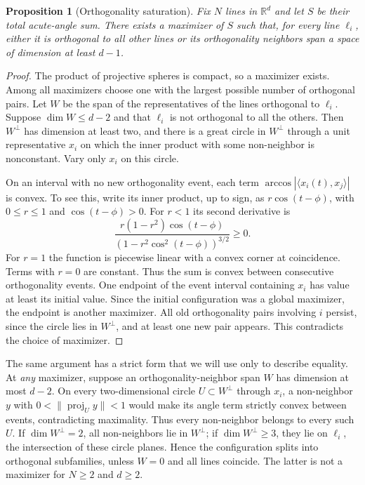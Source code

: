 \documentclass[11pt]{article}
\newtheorem{proposition}{Proposition}
\begin{document}
\begin{proposition}[Orthogonality saturation]
Fix $N$ lines in $\mathbb R^d$ and let $S$ be their total acute-angle
sum.  There exists a maximizer of $S$ such that, for every line
$\ell_i$, either it is orthogonal to all other lines or its
orthogonality neighbors span a space of dimension at least $d-1$.
\end{proposition}
\begin{proof}
The product of projective spheres is compact, so a maximizer exists.
Among all maximizers choose one with the largest possible number of
orthogonal pairs.  Let $W$ be the span of the representatives of the
lines orthogonal to $\ell_i$.  Suppose $\dim W\leq d-2$ and that
$\ell_i$ is not orthogonal to all the others.  Then $W^\perp$ has
dimension at least two, and there is a great circle in $W^\perp$
through a unit representative $x_i$ on which the inner product with
some non-neighbor is nonconstant.  Vary only $x_i$ on this circle.

On an interval with no new orthogonality event, each term
$\arccos|\langle x_i(t),x_j\rangle|$ is convex.  To see this,
write its inner product, up to sign, as $r\cos(t-\phi)$, with
$0\leq r\leq1$ and $\cos(t-\phi)>0$.  For $r<1$ its second
derivative is
\[
 \frac{r(1-r^2)\cos(t-\phi)}
 {(1-r^2\cos^2(t-\phi))^{3/2}}\geq0.
\]
For $r=1$ the function is piecewise linear with a convex corner
at coincidence.  Terms with $r=0$ are constant.  Thus the sum is
convex between consecutive orthogonality events.  One endpoint of
the event interval containing $x_i$ has value at least its initial
value.  Since the initial configuration was a global maximizer, the
endpoint is another maximizer.  All old orthogonality pairs involving
$i$ persist, since the circle lies in $W^\perp$, and at least one
new pair appears.  This contradicts the choice of maximizer.
\end{proof}

The same argument has a strict form that we will use only to describe
equality.  At \emph{any} maximizer, suppose an orthogonality-neighbor
span $W$ has dimension at most $d-2$.  On every two-dimensional circle
$U\subset W^\perp$ through $x_i$, a non-neighbor $y$ with
$0<\|\operatorname{proj}_U y\|<1$ would make its angle term strictly
convex between events, contradicting maximality.  Thus every
non-neighbor belongs to every such $U$.  If $\dim W^\perp=2$, all
non-neighbors lie in $W^\perp$; if $\dim W^\perp\geq3$, they lie on
$\ell_i$, the intersection of these circle planes.  Hence the
configuration splits into orthogonal subfamilies, unless $W=0$
and all lines coincide.  The latter is not a maximizer for $N\geq2$
and $d\geq2$.
\end{document}
